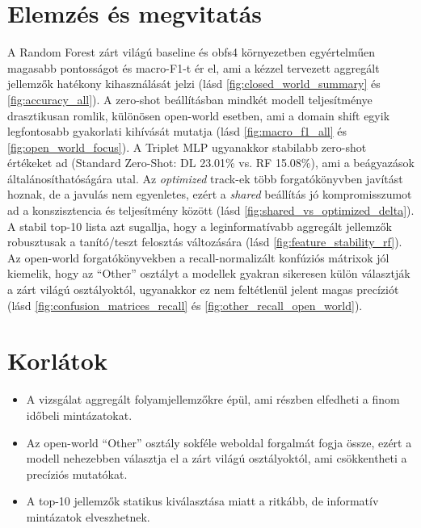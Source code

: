 \documentclass[a4paper,12pt]{article}
\begin{document}
\section{Elemzés és megvitatás}
A Random Forest zárt világú baseline és obfs4 környezetben egyértelműen magasabb
pontosságot és macro-F1-t ér el, ami a kézzel tervezett aggregált jellemzők hatékony
kihasználását jelzi (lásd \ref{fig:closed_world_summary} és \ref{fig:accuracy_all}).
A zero-shot beállításban mindkét modell teljesítménye drasztikusan romlik, különösen
open-world esetben, ami a domain shift egyik legfontosabb gyakorlati kihívását mutatja
(lásd \ref{fig:macro_f1_all} és \ref{fig:open_world_focus}). A Triplet MLP ugyanakkor
stabilabb zero-shot értékeket ad (Standard Zero-Shot: DL 23.01\% vs. RF 15.08\%), ami a
beágyazások általánosíthatóságára utal.
Az \textit{optimized} track-ek több forgatókönyvben javítást hoznak, de a javulás nem
egyenletes, ezért a \textit{shared} beállítás jó kompromisszumot ad a konszisztencia és
teljesítmény között (lásd \ref{fig:shared_vs_optimized_delta}). A stabil top-10 lista
azt sugallja, hogy a leginformatívabb aggregált jellemzők robusztusak a tanító/teszt
felosztás változására (lásd \ref{fig:feature_stability_rf}).
Az open-world forgatókönyvekben a recall-normalizált konfúziós mátrixok jól kiemelik,
hogy az ``Other'' osztályt a modellek gyakran sikeresen külön választják a zárt világú
osztályoktól, ugyanakkor ez nem feltétlenül jelent magas precíziót
(lásd \ref{fig:confusion_matrices_recall} és \ref{fig:other_recall_open_world}).

\section{Korlátok}
\begin{itemize}
    \item A vizsgálat aggregált folyamjellemzőkre épül, ami részben elfedheti a finom időbeli mintázatokat.
    \item Az open-world ``Other'' osztály sokféle weboldal forgalmát fogja össze, ezért a modell
    nehezebben választja el a zárt világú osztályoktól, ami csökkentheti a precíziós mutatókat.
    \item A top-10 jellemzők statikus kiválasztása miatt a ritkább, de informatív mintázatok elveszhetnek.
\end{itemize}
\end{document}
